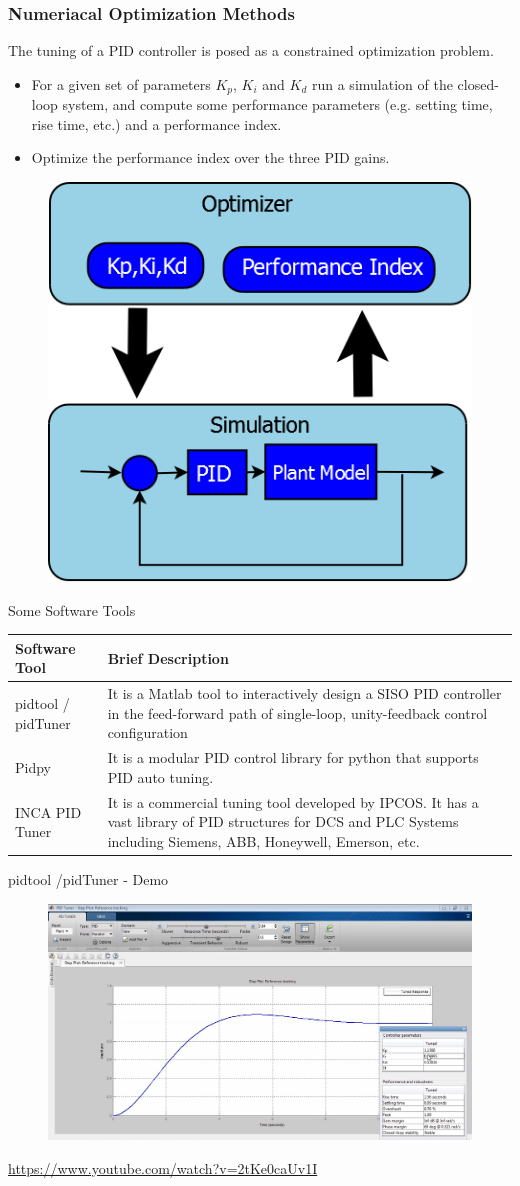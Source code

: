 \begin{frame}
	\small{
	\frametitle{Numeriacal Optimization Methods}
	The tuning of a PID controller is posed as a constrained optimization problem. 
	\begin{itemize}
			\item For a given set of parameters $K_p$, $K_i$ and $K_d$ run a simulation of the closed-loop system, and compute some performance parameters (e.g. setting time, rise time, etc.) and a performance index.
			\item Optimize the performance index over the three PID gains.
	\end{itemize}}
\begin{figure}

\includegraphics[width=0.3\linewidth]{img/PID_1}
\end{figure}

	
\end{frame}
\begin{frame}{Some Software Tools}
	\begin{tabular}{|p{3cm}|p{6cm}|}
		\hline Software Tool  & Brief Description  \\ 
		\hline pidtool / pidTuner
		 & It is a Matlab tool to interactively design a SISO PID controller in the feed-forward path of single-loop, unity-feedback control configuration \\ 
		\hline Pidpy
		 & It is a modular PID control library for python that supports PID auto tuning.
		  \\ 
		\hline INCA PID Tuner
		 & It is a commercial tuning tool developed by IPCOS. It has a vast library of PID structures for DCS and PLC  Systems including Siemens, ABB, Honeywell, Emerson, etc. 
		   \\ 
		\hline 
	\end{tabular} 
\end{frame}
\begin{frame}{pidtool /pidTuner - Demo}
	\begin{figure}
\centering
\includegraphics[width=0.7\linewidth]{img/pid_tool}

\end{figure}
\url{https://www.youtube.com/watch?v=2tKe0caUv1I}
\end{frame}

